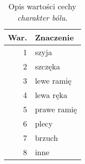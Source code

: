 \begin{multicols}{2}
    \begin{wraptable}{c}{\linewidth}
        \caption{Opis wartości cechy \textit{charakter bólu}.}\label{tab:cecha_5}
        \begin{tabu}{rX[l]}
            \toprule
            \textbf{War.} & \textbf{Znaczenie} \\
            \midrule

            1             & szyja              \\
            2             & szczęka            \\
            3             & lewe ramię         \\
            4             & lewa ręka          \\
            5             & prawe ramię        \\
            6             & plecy              \\
            7             & brzuch             \\
            8             & inne               \\
            \bottomrule
        \end{tabu}
    \end{wraptable}


\end{multicols}
